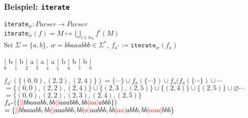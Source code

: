 \documentclass{beamer}
\newcommand{\red}[1]{\textcolor{red}{#1}}
\begin{document}
    \begin{frame}[t]
        \frametitle{\textbf{Beispiel:} \texttt{iterate}}
        \texttt{iterate}$_w : Parser \to Parser$\\
        \texttt{iterate}$_w(f) = \displaystyle M \mapsto \bigcup_{i \in \mathbb{N}_0} f^i(M)$\\[10pt]
        Sei $\Sigma = \{a,b\},\ w = bbaaabbb \in \Sigma^*,\ f_{a^*} := \texttt{iterate}_w(f_a)$\\
        \begin{center}
            $\underset{0}{|}$
                {\Large b}
            $\underset{1}{|}$
                {\Large b}
            $\underset{2}{|}$
                {\Large a}
            $\underset{3}{|}$
                {\Large a}
            $\underset{4}{|}$
                {\Large a}
            $\underset{5}{|}$
                {\Large b}
            $\underset{6}{|}$
                {\Large b}
            $\underset{7}{|}$
                {\Large b}
            $\underset{8}{|}$\\[10pt]
        \end{center}
        \pause
        $
            f_{a^*}(\{(0,0), (2,2), (2,4)\})
            = \{\cdots\} \cup f_a(\{\cdots\}) \cup f_a(f_a(\{\cdots\}) \cup \cdots
        $\\[5pt]\pause
        $
            = \{(0,0),(2,2),(2,4)\} \cup \{(2,3),(2,5)\} \cup \{(2,4)\} \cup \{(2,5)\} \cup \varnothing \cdots
        $\\[5pt]\pause
        $
            = \{(0,0),(2,2),(2,3),(2,4),(2,5)\}
        $\\[15pt]
        \pause
        $
            f_{a^*}(\{\red{||}bbaaabb, bb\red{||}aaabbb, bb\red{|aa|}abbb\})
        $\\[5pt]
        $
            = \{\red{||}bbaaabb, bb\red{||}aaabbb, bb\red{|a|}aabbb, bb\red{|aa|}abbb, bb\red{|aaa|}bbb\}
        $
    \end{frame}

\end{document}
